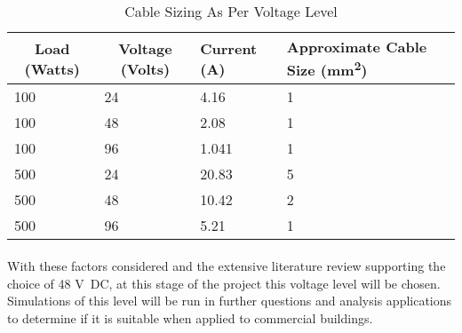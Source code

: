\begin{table}[H]
\centering
\begin{tabular}{|l|l|l|p{5cm}|}
\hline
\multicolumn{1}{|c|}{\textbf{Load (Watts)}} & \multicolumn{1}{c|}{\textbf{Voltage (Volts)}} & \textbf{Current (A)} & \textbf{Approximate Cable Size (\si{mm^2})} \\ \hline
100 & 24 & 4.16 & 1 \\ \hline
100 & 48 & 2.08 & 1 \\ \hline
100 & 96 & 1.041 & 1 \\ \hline
500 & 24 & 20.83 & 5 \\ \hline
500 & 48 & 10.42 & 2 \\ \hline
500 & 96 & 5.21 & 1 \\ \hline
\end{tabular}
\caption{Cable Sizing As Per Voltage Level}
\label{table:lvdc-cables}
\end{table} 

\paragraph{}
With these factors considered and the extensive literature review supporting the choice of 48 \si{V DC}, at this stage of the project this voltage level will be chosen. Simulations of this level will be run in further questions and analysis applications to determine if it is suitable when applied to commercial buildings.  

   

